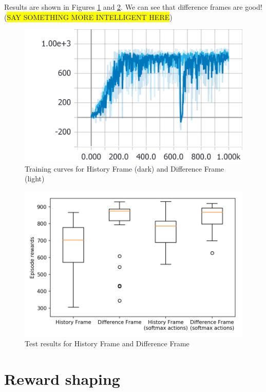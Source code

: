 \documentclass[a4paper, 11pt, conference]{ieeeconf}      %
\begin{document}
Results are shown in Figures \ref{fig:train3} and \ref{fig:test3}. We can see that difference frames are good! (\colorbox{yellow}{SAY SOMETHING MORE INTELLIGENT HERE})

\begin{figure}
  \includegraphics[width=\linewidth]{figs/racecar_train_3.png}
  \caption{Training curves for History Frame (dark) and Difference Frame (light)}
  \label{fig:train3}
\end{figure}

\begin{figure}
  \includegraphics[width=\linewidth]{figs/racecar_3.png}
  \caption{Test results for History Frame and Difference Frame}
  \label{fig:test3}
\end{figure}

\section{Reward shaping}
\end{document}
